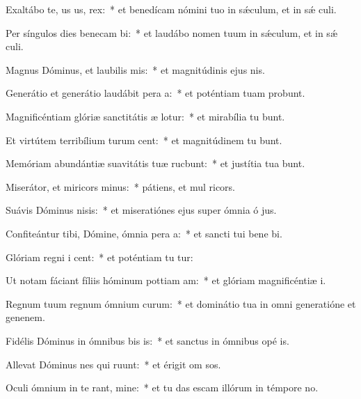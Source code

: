 \item Exaltábo te, us us, rex:~* et benedícam nómini tuo in sǽculum, et in sǽ culi.
\item Per síngulos dies benecam bi:~* et laudábo nomen tuum in sǽculum, et in sǽ culi.
\item Magnus Dóminus, et laubilis mis:~* et magnitúdinis ejus   nis.
\item Generátio et generátio laudábit pera a:~* et poténtiam tuam probunt.
\item Magnificéntiam glóriæ sanctitátis æ lotur:~* et mirabília tu bunt.
\item Et virtútem terribílium turum cent:~* et magnitúdinem tu bunt.
\item Memóriam abundántiæ suavitátis tuæ rucbunt:~* et justítia tua bunt.
\item Miserátor, et miricors minus:~* pátiens, et mul ricors.
\item Suávis Dóminus nisis:~* et miseratiónes ejus super ómnia ó jus.
\item Confiteántur tibi, Dómine, ómnia pera a:~* et sancti tui bene bi.
\item Glóriam regni i cent:~* et poténtiam tu tur:
\item Ut notam fáciant fíliis hóminum pottiam am:~* et glóriam magnificéntiæ  i.
\item Regnum tuum regnum ómnium curum:~* et dominátio tua in omni generatióne et genenem.
\item Fidélis Dóminus in ómnibus bis is:~* et sanctus in ómnibus opé is.
\item Allevat Dóminus nes qui ruunt:~* et érigit om sos.
\item Oculi ómnium in te rant, mine:~* et tu das escam illórum in témpore no.
